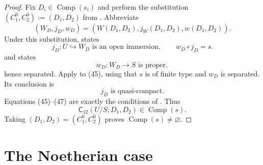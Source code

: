 \begin{proof}
  Fix $D_i\in\operatorname{Comp}(s_i)$ and perform the substitution
  $(C_1^0,C_2^0):=(D_1,D_2)$ from
  .  Abbreviate
  \[
    (W_D,j_D,w_D)
      =(W(D_1,D_2),j_W(D_1,D_2),w(D_1,D_2)).
  \]
  Under this substitution,
   states
  \[
    j_D\colon U\hookrightarrow W_D\text{ is an open immersion},\qquad
    w_D\circ j_D=s.                                                \tag{45}
  \]
  and  states
  \[
    w_D\colon W_D\to S\text{ is proper},                          \tag{46}
  \]
  hence separated.  Apply
   to (45), using
  that $s$ is of finite type and $w_D$ is separated.  Its conclusion is
  \[
    j_D\text{ is quasi-compact}.                                  \tag{47}
  \]
  Equations (45)--(47) are exactly the conditions of
  .  Thus
  \[
    \mathsf C_{12}(U/S;D_1,D_2)\in\operatorname{Comp}(s).
  \]
  Taking $(D_1,D_2)=(C_1^0,C_2^0)$ proves
  $\operatorname{Comp}(s)\neq\varnothing$.
\end{proof}
\section{The Noetherian case}

